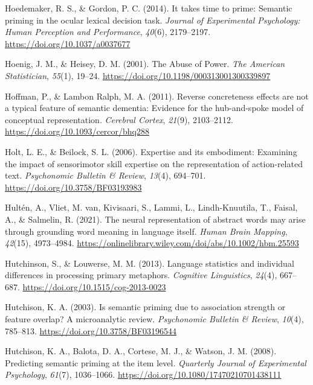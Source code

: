 \documentclass[
  12pt,
  man,floatsintext]{apa7}
\newlength{\cslhangindent}
\newlength{\cslentryspacingunit} %
\newenvironment{CSLReferences}[2] %
 {%
  \setlength{\parindent}{0pt}
  \ifodd #1
  \let\oldpar\par
  \def\par{\hangindent=\cslhangindent\oldpar}
  \fi
  \setlength{\parskip}{#2\cslentryspacingunit}
 }%
 {}
\begin{document}
\begin{CSLReferences}{1}{0}
\leavevmode{}%
Hoedemaker, R. S., \& Gordon, P. C. (2014). It takes time to prime: {Semantic} priming in the ocular lexical decision task. \emph{Journal of Experimental Psychology: Human Perception and Performance}, \emph{40}(6), 2179--2197. \url{https://doi.org/10.1037/a0037677}

\leavevmode{}%
Hoenig, J. M., \& Heisey, D. M. (2001). The {Abuse} of {Power}. \emph{The American Statistician}, \emph{55}(1), 19--24. \url{https://doi.org/10.1198/000313001300339897}

\leavevmode{}%
Hoffman, P., \& Lambon Ralph, M. A. (2011). Reverse concreteness effects are not a typical feature of semantic dementia: {Evidence} for the hub-and-spoke model of conceptual representation. \emph{Cerebral Cortex}, \emph{21}(9), 2103--2112. \url{https://doi.org/10.1093/cercor/bhq288}

\leavevmode{}%
Holt, L. E., \& Beilock, S. L. (2006). Expertise and its embodiment: {Examining} the impact of sensorimotor skill expertise on the representation of action-related text. \emph{Psychonomic Bulletin \& Review}, \emph{13}(4), 694--701. \url{https://doi.org/10.3758/BF03193983}

\leavevmode{}%
Hultén, A., Vliet, M. van, Kivisaari, S., Lammi, L., Lindh-Knuutila, T., Faisal, A., \& Salmelin, R. (2021). The neural representation of abstract words may arise through grounding word meaning in language itself. \emph{Human Brain Mapping}, \emph{42}(15), 4973--4984. \url{https://onlinelibrary.wiley.com/doi/abs/10.1002/hbm.25593}

\leavevmode{}%
Hutchinson, S., \& Louwerse, M. M. (2013). Language statistics and individual differences in processing primary metaphors. \emph{Cognitive Linguistics}, \emph{24}(4), 667--687. \url{https://doi.org/10.1515/cog-2013-0023}

\leavevmode{}%
Hutchison, K. A. (2003). Is semantic priming due to association strength or feature overlap? {A} microanalytic review. \emph{Psychonomic Bulletin \& Review}, \emph{10}(4), 785--813. \url{https://doi.org/10.3758/BF03196544}

\leavevmode{}%
Hutchison, K. A., Balota, D. A., Cortese, M. J., \& Watson, J. M. (2008). Predicting semantic priming at the item level. \emph{Quarterly Journal of Experimental Psychology}, \emph{61}(7), 1036--1066. \url{https://doi.org/10.1080/17470210701438111}


\end{CSLReferences}
\end{document}
